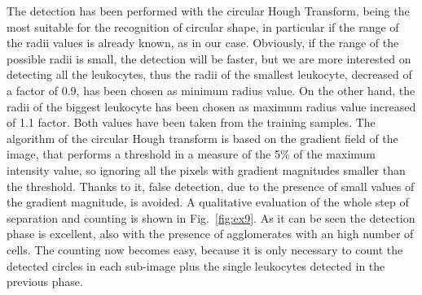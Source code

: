 \documentclass[final,a4paper,12pt,english]{UnicaPhdThesis3}
\begin{document}
	The detection has been performed with the circular Hough Transform, being the most suitable for the recognition of circular shape, in particular if the range of the radii values is already known, as in our case. Obviously, if the range of the possible radii is small, the detection will be faster, but we are more interested on detecting all the leukocytes, thus the radii of the smallest leukocyte, decreased of a factor of 0.9, has been chosen as minimum radius value. On the other hand, the radii of the biggest leukocyte has been chosen as maximum radius value increased of 1.1 factor. Both values have been taken from the training samples. The algorithm of the circular Hough transform is based on the gradient field of the image, that performs a threshold in a measure of the 5\% of the maximum intensity value, so ignoring all the pixels with gradient magnitudes smaller than the threshold. Thanks to it, false detection, due to the presence of small values of the gradient magnitude, is avoided. A qualitative evaluation of the whole step of separation and counting is shown in Fig.~\ref{fig:ex9}.  As it can be seen the detection phase is excellent, also with the presence of agglomerates with an high number of cells. The counting now becomes easy, because it is only necessary to count the detected circles in each sub-image plus the single leukocytes detected in the previous phase.
\end{document}
